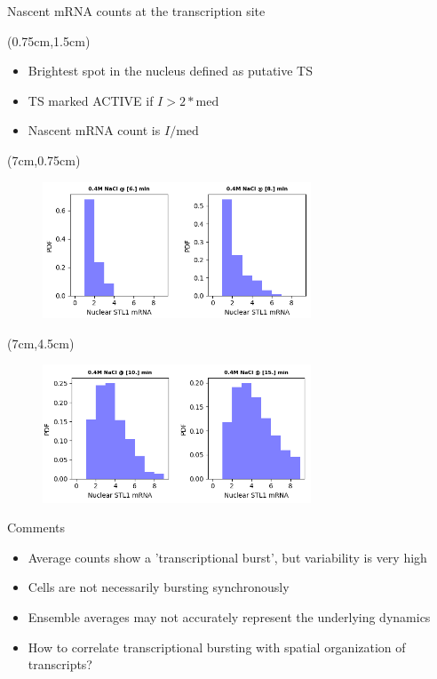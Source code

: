 \documentclass[aspectratio=1610]{beamer}					%
\begin{document}
\begin{frame}{Nascent mRNA counts at the transcription site}

\begin{textblock*}{5cm}(0.75cm,1.5cm)
\begin{itemize}
\item Brightest spot in the nucleus defined as putative TS
\item TS marked ACTIVE if $I>2*\mathrm{med}$
\item Nascent mRNA count is $I/\mathrm{med}$
\end{itemize}

\end{textblock*}

\begin{textblock*}{5cm}(7cm,0.75cm)
\begin{figure}
\includegraphics[width=8cm]{active-ts-dist-2.png}
\end{figure}
\end{textblock*}

\begin{textblock*}{5cm}(7cm,4.5cm)
\begin{figure}
\includegraphics[width=8cm]{active-ts-dist-1.png}
\end{figure}
\end{textblock*}

\end{frame}


\begin{frame}{Comments}


\begin{itemize}
\item Average counts show a 'transcriptional burst', but variability is very high
\item Cells are not necessarily bursting synchronously
\item Ensemble averages may not accurately represent the underlying dynamics
\item How to correlate transcriptional bursting with spatial organization of transcripts?
\end{itemize}


\end{frame}
\end{document}
